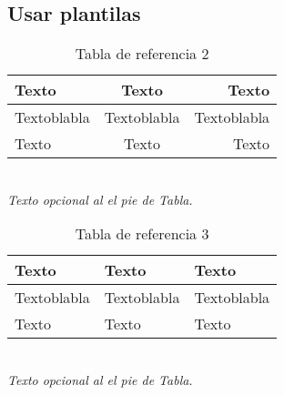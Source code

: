 \documentclass[../main.tex]{subfiles}
\begin{document}



\subsection{Usar plantilas}
\begin{minipage}[H]{0.49\textwidth}
    \begin{table}[H]
        \centering
        \begin{measuredfigure}
            \caption{Tabla de referencia 2}
            \begin{tabular}{| l | c | r |} 
            \hline
                \textbf{Texto} & \textbf{Texto} & \textbf{Texto} \\ \hline
                Textoblabla    & Textoblabla   & Textoblabla \\ \hline
                Texto    & Texto   & Texto \\ \hline
            \end{tabular}
        \end{measuredfigure}
        \\ \textit{\scriptsize{Texto opcional al el pie de Tabla.}}
    \end{table}
\end{minipage}
\begin{minipage}[H]{0.49\textwidth}
    \begin{table}[H]
        \centering
        \begin{measuredfigure}
            \caption{Tabla de referencia 3}
            \begin{tabular}{l l l}
            \toprule
                \textbf{Texto} & \textbf{Texto} & \textbf{Texto} \\
                \midrule
                Textoblabla    & Textoblabla   & Textoblabla \\
                Texto    & Texto   & Texto \\
                \bottomrule
            \end{tabular}
        \end{measuredfigure}
        \\ \textit{\scriptsize{Texto opcional al el pie de Tabla.}}
    \end{table}
\end{minipage}
\end{document}
